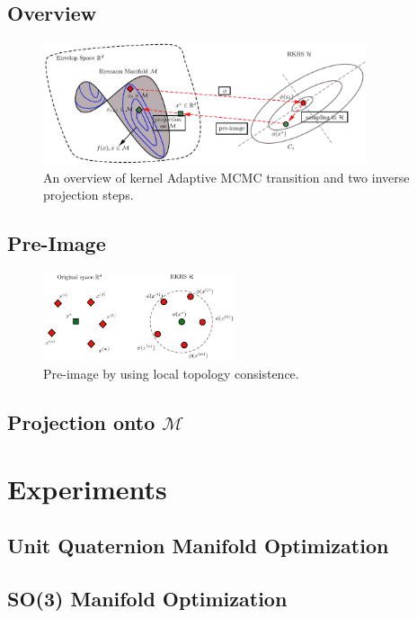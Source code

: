\documentclass{article}
\begin{document}
\subsection{Overview}
\begin{figure}[t]
	\centering
	\includegraphics[width=0.85\textwidth]{overview}
	\caption{An overview of kernel Adaptive MCMC transition and two inverse projection steps.}
	\label{fig:over_view}
\end{figure}

\subsection{Pre-Image}

\begin{figure}[t]
	\centering
	\includegraphics[width=0.5\textwidth]{pre-image}
	\caption{Pre-image by using local topology consistence.  }
	\label{fig:over_view}
\end{figure}


\subsection{Projection onto $\mathcal{M}$}

\section{Experiments}
\subsection{Unit Quaternion Manifold Optimization}
\subsection{SO(3) Manifold Optimization}





\end{document}
